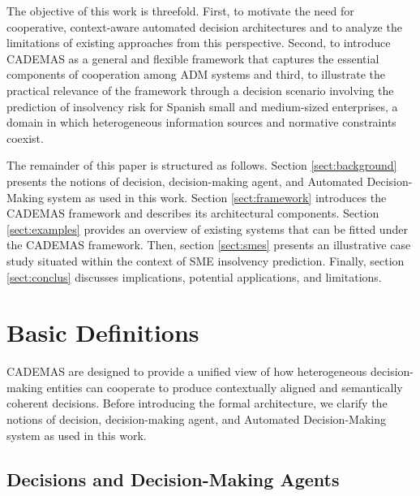\documentclass[letterpaper, 10 pt,conference]{IEEEconf}
\begin{document}
The objective of this work is threefold. First, to motivate the need for cooperative, context-aware automated decision architectures and to analyze the limitations of existing approaches from this perspective. Second, to introduce CADEMAS as a general and flexible framework that captures the essential components of cooperation among ADM systems and third, to illustrate the practical relevance of the framework through a decision scenario involving the prediction of insolvency risk for Spanish small and medium-sized enterprises, a domain in which heterogeneous information sources and normative constraints coexist.

The remainder of this paper is structured as follows. Section \ref{sect:background} presents the notions of decision, decision-making agent, and Automated Decision-Making system as used in this work. Section \ref{sect:framework} introduces the CADEMAS framework and describes its architectural components. Section \ref{sect:examples} provides an overview of existing systems that can be fitted under the CADEMAS framework. 
Then, section \ref{sect:smes} presents an illustrative case study situated within the context of SME insolvency prediction. Finally, section \ref{sect:conclus} discusses implications, potential applications, and limitations. 

\section{Basic Definitions\label{sect:background}}

CADEMAS are designed to provide a unified view of how heterogeneous decision-making entities can cooperate to produce contextually aligned and semantically coherent decisions. Before introducing the formal architecture, we clarify the notions of decision, decision-making agent, and Automated Decision-Making system as used in this work.

\subsection{Decisions and Decision-Making Agents}
\end{document}
